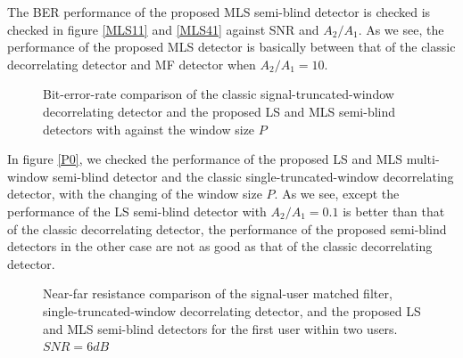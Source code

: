 \documentclass[a4paper,10pt,fleqn, twocolumn]{IEEETran}
\begin{document}
The BER performance of the proposed MLS semi-blind detector is
checked is checked in figure \ref{MLS11} and \ref{MLS41} against
SNR and $A_2/A_1$. As we see, the performance of the proposed MLS
detector is basically between that of the classic decorrelating
detector and MF detector when $A_2/A_1=10$.

\begin{figure}
\caption{Bit-error-rate comparison of the classic
signal-truncated-window decorrelating detector and the proposed LS
and MLS semi-blind detectors with against the window size $P$}
\label{P1}
\end{figure}

In figure \ref{P0}, we checked the performance of the proposed LS
and MLS multi-window semi-blind detector and the classic
single-truncated-window decorrelating detector, with the changing
of the window size $P$. As we see, except the performance of the
LS semi-blind detector with $A_2/A_1=0.1$ is better than that of
the classic decorrelating detector, the performance of the
proposed semi-blind detectors in the other case are not as good as
that of the classic decorrelating detector.

\begin{figure}
\caption{Near-far resistance comparison of the signal-user matched
filter, single-truncated-window decorrelating detector, and the
proposed LS and MLS semi-blind detectors for the first user within
two users. $SNR=6dB$} \label{NFR1}
\end{figure}
\end{document}
